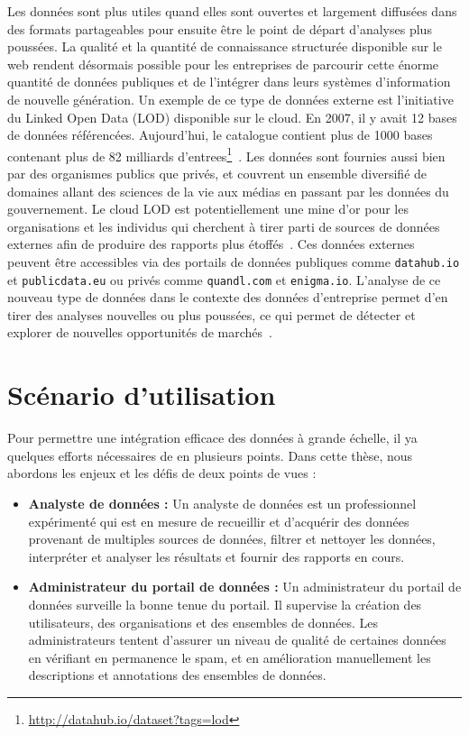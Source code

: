 Les donn\'{e}es sont plus utiles quand elles sont ouvertes et largement diffus\'{e}es dans des formats partageables pour ensuite \^{e}tre le point de d\'{e}part d'analyses plus pouss\'{e}es. La qualit\'{e} et la quantit\'{e} de connaissance structur\'{e}e disponible sur le web rendent d\'{e}sormais possible pour les entreprises de parcourir cette \'{e}norme quantit\'{e} de donn\'{e}es publiques et de l'int\'{e}grer dans leurs syst\`{e}mes d'information de nouvelle g\'{e}n\'{e}ration. Un exemple de ce type de donn\'{e}es externe est l'initiative du Linked Open Data (LOD) disponible sur le cloud. En 2007, il y avait 12 bases de donn\'{e}es r\'{e}f\'{e}renc\'{e}es. Aujourd'hui, le catalogue contient plus de 1000 bases contenant plus de 82 milliards d'entrees\footnote{\url{http://datahub.io/dataset?tags=lod}}~\cite{Bizer:IJSWIS:09}. Les donn\'{e}es sont fournies aussi bien par des organismes publics que priv\'{e}s, et couvrent un ensemble diversifi\'{e} de domaines allant des sciences de la vie aux m\'{e}dias en passant par les donn\'{e}es du gouvernement. Le cloud LOD est potentiellement une mine d'or pour les organisations et les individus qui cherchent \`{a} tirer parti de sources de donn\'{e}es externes afin de produire des rapports plus \'{e}toff\'{e}s~\cite{Boyd:Article:11}. Ces donn\'{e}es externes peuvent \^{e}tre accessibles via des portails de donn\'{e}es publiques comme \texttt {datahub.io} et \texttt {publicdata.eu} ou priv\'{e}s comme \texttt{quandl.com} et \texttt{enigma.io}. L'analyse de ce nouveau type de donn\'{e}es dans le contexte des donn\'{e}es d'entreprise permet d'en tirer des analyses nouvelles ou plus pouss\'{e}es, ce qui permet de d\'{e}tecter et explorer de nouvelles opportunit\'{e}s de march\'{e}s~\cite{LaValle:MIT:11}.

\section{Sc\'{e}nario d'utilisation}

Pour permettre une int\'{e}gration efficace des donn\'{e}es \`{a} grande \'{e}chelle, il ya quelques efforts n\'{e}cessaires de en plusieurs points. Dans cette th\`{e}se, nous abordons les enjeux et les d\'{e}fis de deux points de vues :

\begin{itemize}
	\item \textbf{Analyste de donn\'{e}es :} Un analyste de donn\'{e}es est un professionnel exp\'{e}riment\'{e} qui est en mesure de recueillir et d'acqu\'{e}rir des donn\'{e}es provenant de multiples sources de donn\'{e}es, filtrer et nettoyer les donn\'{e}es, interpr\'{e}ter et analyser les r\'{e}sultats et fournir des rapports en cours.
	\item \textbf{Administrateur du portail de donn\'{e}es :} Un administrateur du portail de donn\'{e}es surveille la bonne tenue du portail. Il supervise la cr\'{e}ation des utilisateurs, des organisations et des ensembles de donn\'{e}es. Les administrateurs tentent d'assurer un niveau de qualit\'{e} de certaines donn\'{e}es en v\'{e}rifiant en permanence le spam, et en am\'{e}lioration manuellement les descriptions et annotations des ensembles de donn\'{e}es.
\end{itemize}

